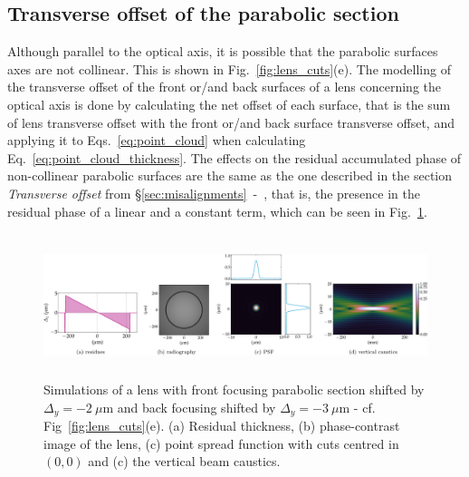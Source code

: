 \begin{refsection}
\subsection{Transverse offset of the parabolic section}

Although parallel to the optical axis, it is possible that the parabolic surfaces axes are not collinear. This is shown in Fig.~\ref{fig:lens_cuts}(e). The modelling of the transverse offset of the front or/and back surfaces of a lens concerning the optical axis is done by calculating the net offset of each surface, that is the sum of lens transverse offset with the front or/and back surface transverse offset, and applying it to Eqs.~\ref{eq:point_cloud} when calculating Eq.~\ref{eq:point_cloud_thickness}. The effects on the residual accumulated phase of non-collinear parabolic surfaces are the same as the one described in the section \textit{Transverse offset} from \S\ref{sec:misalignments}~-~\textit{}, that is, the presence in the residual phase of a linear and a constant term, which can be seen in Fig.~\ref{fig:offset_fs_CRL}.


\begin{figure}[t]
        \centering
        \includegraphics[height=4.19cm]{figures/ch04/offset_fs_CRL.pdf}
        \caption[Effects of the transverse offset of the parabolic section]{Simulations of a lens with front focusing parabolic section shifted by $\Delta_y=-2~\mu$m and back focusing shifted by $\Delta_y=-3~\mu$m - cf. Fig~\ref{fig:lens_cuts}(e). (a) Residual thickness, (b) phase-contrast image of the lens, (c) point spread function with cuts centred in $(0,0)$ and (c) the vertical beam caustics.} \label{fig:offset_fs_CRL}
\end{figure}


\end{refsection}
